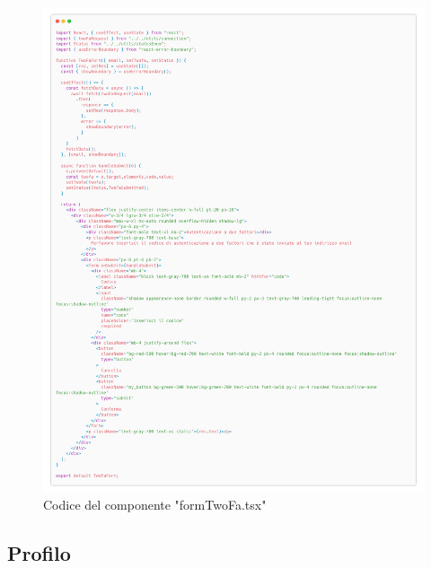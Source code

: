 \documentclass{report}
\begin{document}
\begin{itemize}
\begin{itemize}
\begin{figure}[H]
			\centering\includegraphics[width=1\textwidth]{images/microservizio-autenticazione/frontend/formTwoFa-carbon.png}
			Codice del componente "formTwoFa.tsx"
		\end{figure}
	\end{itemize}
\end{itemize}

\subsection{Profilo}
\end{document}
